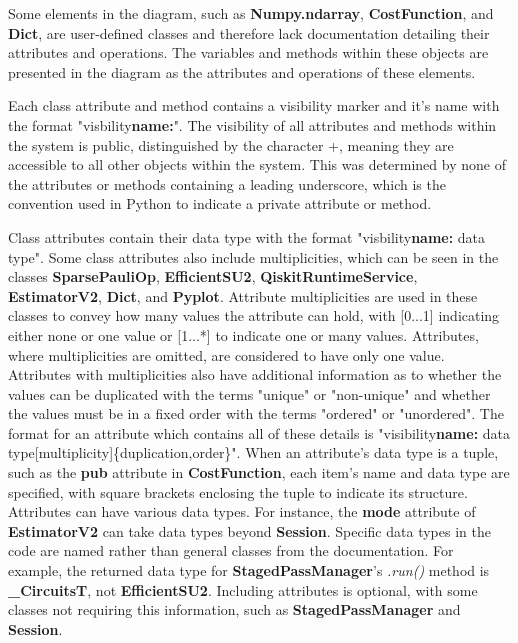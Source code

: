 \documentclass{article}
\begin{document}
Some elements in the diagram, such as \textbf{Numpy.ndarray}, \textbf{CostFunction}, and \textbf{Dict}, are user-defined classes and therefore lack documentation detailing their attributes and operations. The variables and methods within these objects are presented in the diagram as the attributes and operations of these elements.

Each class attribute and method contains a visibility marker and it's name with the format "visbility\textbf{name:}". The visibility of all attributes and methods within the system is public, distinguished by the character +, meaning they are accessible to all other objects within the system\cite{Seidl_Scholz_Huemer_Kappel_Duffy_2014}. This was determined by none of the attributes or methods containing a leading underscore, which is the convention used in Python to indicate a private attribute or method\cite{Privacy}.

Class attributes contain their data type with the format "visbility\textbf{name:} data type". Some class attributes also include multiplicities, which can be seen in the classes \textbf{SparsePauliOp}, \textbf{EfficientSU2}, \textbf{QiskitRuntimeService}, \textbf{EstimatorV2}, \textbf{Dict}, and \textbf{Pyplot}. Attribute multiplicities are used in these classes to convey how many values the attribute can hold, with [0...1] indicating either none or one value or [1...*] to indicate one or many values\cite{Seidl_Scholz_Huemer_Kappel_Duffy_2014}. Attributes, where multiplicities are omitted, are considered to have only one value\cite{Seidl_Scholz_Huemer_Kappel_Duffy_2014}. Attributes with multiplicities also have additional information as to whether the values can be duplicated with the terms "unique" or "non-unique" and whether the values must be in a fixed order with the terms "ordered" or "unordered"\cite{Seidl_Scholz_Huemer_Kappel_Duffy_2014}. The format for an attribute which contains all of these details is "visibility\textbf{name:} data type[multiplicity]\{duplication,order\}". When an attribute's data type is a tuple, such as the \textbf{pub} attribute in \textbf{CostFunction}, each item's name and data type are specified, with square brackets enclosing the tuple to indicate its structure. Attributes can have various data types. For instance, the \textbf{mode} attribute of \textbf{EstimatorV2} can take data types beyond \textbf{Session}. Specific data types in the code are named rather than general classes from the documentation. For example, the returned data type for \textbf{StagedPassManager}'s \textit{.run()} method is \textbf{\_CircuitsT}, not \textbf{EfficientSU2}\cite{StagedPassManager}. Including attributes is optional, with some classes not requiring this information, such as \textbf{StagedPassManager} and \textbf{Session}. 
\end{document}
